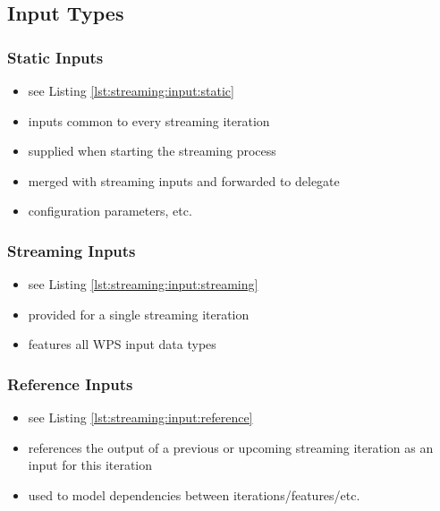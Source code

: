	\subsection{Input Types}\label{sec:streaming:input-types}
	\subsubsection{Static Inputs}
		\begin{itemize}
			\item see Listing \ref{lst:streaming:input:static}
			\item inputs common to every streaming iteration
			\item supplied when starting the streaming process
			\item merged with streaming inputs and forwarded to delegate
			\item configuration parameters, etc.
		\end{itemize}
	\subsubsection{Streaming Inputs}
		\begin{itemize}
			\item see Listing \ref{lst:streaming:input:streaming}
			\item provided for a single streaming iteration
			\item features all WPS input data types
		\end{itemize}
	\subsubsection{Reference Inputs}
		\begin{itemize}
			\item see Listing \ref{lst:streaming:input:reference}
			\item references the output of a previous or upcoming streaming iteration as an input for this iteration
			\item used to model dependencies between iterations/features/etc.
		\end{itemize}
